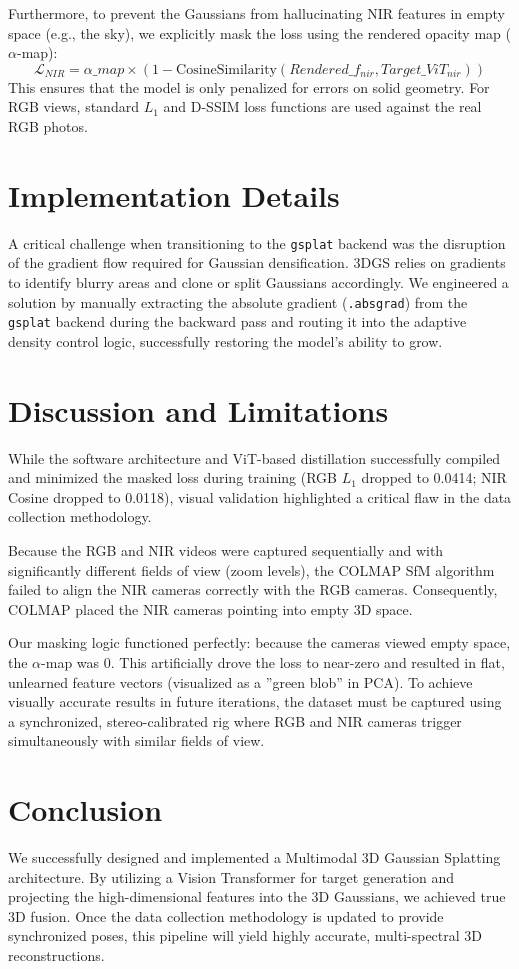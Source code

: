 \documentclass[12pt]{article}
\begin{document}
Furthermore, to prevent the Gaussians from hallucinating NIR features in empty space (e.g., the sky), we explicitly mask the loss using the rendered opacity map ($\alpha$-map):
\begin{equation}
\mathcal{L}_{NIR} = \alpha\_map \times (1 - \text{CosineSimilarity}(Rendered\_f_{nir}, Target\_ViT_{nir}))
\end{equation}
This ensures that the model is only penalized for errors on solid geometry. For RGB views, standard $L_1$ and D-SSIM loss functions are used against the real RGB photos.

\section{Implementation Details}
A critical challenge when transitioning to the \texttt{gsplat} backend was the disruption of the gradient flow required for Gaussian densification. 3DGS relies on gradients to identify blurry areas and clone or split Gaussians accordingly. We engineered a solution by manually extracting the absolute gradient (\texttt{.absgrad}) from the \texttt{gsplat} backend during the backward pass and routing it into the adaptive density control logic, successfully restoring the model's ability to grow.

\section{Discussion and Limitations}
While the software architecture and ViT-based distillation successfully compiled and minimized the masked loss during training (RGB $L_1$ dropped to 0.0414; NIR Cosine dropped to 0.0118), visual validation highlighted a critical flaw in the data collection methodology.

Because the RGB and NIR videos were captured sequentially and with significantly different fields of view (zoom levels), the COLMAP SfM algorithm failed to align the NIR cameras correctly with the RGB cameras. Consequently, COLMAP placed the NIR cameras pointing into empty 3D space. 

Our masking logic functioned perfectly: because the cameras viewed empty space, the $\alpha$-map was 0. This artificially drove the loss to near-zero and resulted in flat, unlearned feature vectors (visualized as a ''green blob'' in PCA). To achieve visually accurate results in future iterations, the dataset must be captured using a synchronized, stereo-calibrated rig where RGB and NIR cameras trigger simultaneously with similar fields of view.

\section{Conclusion}
We successfully designed and implemented a Multimodal 3D Gaussian Splatting architecture. By utilizing a Vision Transformer for target generation and projecting the high-dimensional features into the 3D Gaussians, we achieved true 3D fusion. Once the data collection methodology is updated to provide synchronized poses, this pipeline will yield highly accurate, multi-spectral 3D reconstructions.
\end{document}
